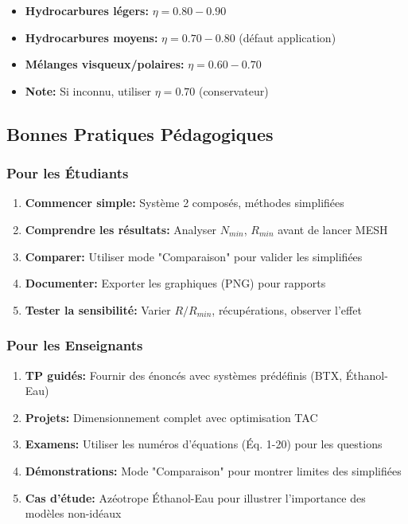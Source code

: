 \documentclass[11pt,a4paper]{article}
\begin{document}
\begin{itemize}[leftmargin=*]
    \item \textbf{Hydrocarbures légers:} $\eta = 0.80 - 0.90$
    \item \textbf{Hydrocarbures moyens:} $\eta = 0.70 - 0.80$ (défaut application)
    \item \textbf{Mélanges visqueux/polaires:} $\eta = 0.60 - 0.70$
    \item \textbf{Note:} Si inconnu, utiliser $\eta = 0.70$ (conservateur)
\end{itemize}

\subsection{Bonnes Pratiques Pédagogiques}

\subsubsection{Pour les Étudiants}

\begin{enumerate}[leftmargin=*]
    \item \textbf{Commencer simple:} Système 2 composés, méthodes simplifiées
    \item \textbf{Comprendre les résultats:} Analyser $N_{min}$, $R_{min}$ avant de lancer MESH
    \item \textbf{Comparer:} Utiliser mode "Comparaison" pour valider les simplifiées
    \item \textbf{Documenter:} Exporter les graphiques (PNG) pour rapports
    \item \textbf{Tester la sensibilité:} Varier $R/R_{min}$, récupérations, observer l'effet
\end{enumerate}

\subsubsection{Pour les Enseignants}

\begin{enumerate}[leftmargin=*]
    \item \textbf{TP guidés:} Fournir des énoncés avec systèmes prédéfinis (BTX, Éthanol-Eau)
    \item \textbf{Projets:} Dimensionnement complet avec optimisation TAC
    \item \textbf{Examens:} Utiliser les numéros d'équations (Éq. 1-20) pour les questions
    \item \textbf{Démonstrations:} Mode "Comparaison" pour montrer limites des simplifiées
    \item \textbf{Cas d'étude:} Azéotrope Éthanol-Eau pour illustrer l'importance des modèles non-idéaux
\end{enumerate}
\end{document}
